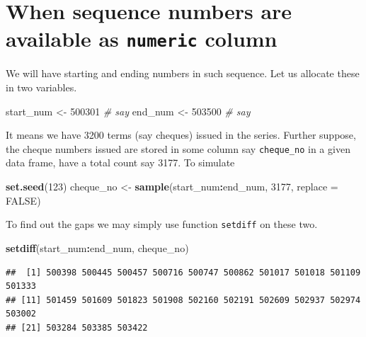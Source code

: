 \documentclass[
]{book}
\newenvironment{Shaded}{\begin{snugshade}}{\end{snugshade}}
\newcommand{\AttributeTok}[1]{\textcolor[rgb]{0.13,0.29,0.53}{#1}}
\newcommand{\CommentTok}[1]{\textcolor[rgb]{0.56,0.35,0.01}{\textit{#1}}}
\newcommand{\ConstantTok}[1]{\textcolor[rgb]{0.56,0.35,0.01}{#1}}
\newcommand{\DecValTok}[1]{\textcolor[rgb]{0.00,0.00,0.81}{#1}}
\newcommand{\FunctionTok}[1]{\textcolor[rgb]{0.13,0.29,0.53}{\textbf{#1}}}
\newcommand{\NormalTok}[1]{#1}
\newcommand{\OtherTok}[1]{\textcolor[rgb]{0.56,0.35,0.01}{#1}}
\newcommand{\SpecialCharTok}[1]{\textcolor[rgb]{0.81,0.36,0.00}{\textbf{#1}}}
\begin{document}
\hypertarget{when-sequence-numbers-are-available-as-numeric-column}{%
\section{\texorpdfstring{When sequence numbers are available as \texttt{numeric} column}{When sequence numbers are available as numeric column}}\label{when-sequence-numbers-are-available-as-numeric-column}}

We will have starting and ending numbers in such sequence. Let us allocate these in two variables.

\begin{Shaded}
\begin{Highlighting}[]
\NormalTok{start\_num }\OtherTok{\textless{}{-}} \DecValTok{500301} \CommentTok{\# say}
\NormalTok{end\_num }\OtherTok{\textless{}{-}} \DecValTok{503500} \CommentTok{\# say}
\end{Highlighting}
\end{Shaded}

It means we have 3200 terms (say cheques) issued in the series. Further suppose, the cheque numbers issued are stored in some column say \texttt{cheque\_no} in a given data frame, have a total count say 3177. To simulate

\begin{Shaded}
\begin{Highlighting}[]
\FunctionTok{set.seed}\NormalTok{(}\DecValTok{123}\NormalTok{)}
\NormalTok{cheque\_no }\OtherTok{\textless{}{-}} \FunctionTok{sample}\NormalTok{(start\_num}\SpecialCharTok{:}\NormalTok{end\_num, }\DecValTok{3177}\NormalTok{, }\AttributeTok{replace =} \ConstantTok{FALSE}\NormalTok{)}
\end{Highlighting}
\end{Shaded}

To find out the gaps we may simply use function \texttt{setdiff} on these two.

\begin{Shaded}
\begin{Highlighting}[]
\FunctionTok{setdiff}\NormalTok{(start\_num}\SpecialCharTok{:}\NormalTok{end\_num, cheque\_no)}
\end{Highlighting}
\end{Shaded}

\begin{verbatim}
##  [1] 500398 500445 500457 500716 500747 500862 501017 501018 501109 501333
## [11] 501459 501609 501823 501908 502160 502191 502609 502937 502974 503002
## [21] 503284 503385 503422
\end{verbatim}
\end{document}
